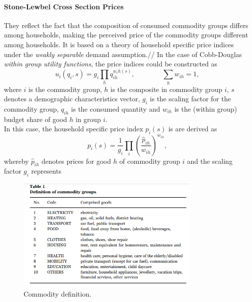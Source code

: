 \paragraph{Stone-Lewbel Cross Section Prices\\}{They reflect the fact that the composition of consumed commodity groups differs among households, making the perceived price of the commodity groups different among households. It is based on a theory of household specific price indices under the \textit{weakly separable} demand assumption.//
	In the case of Cobb-Douglas \textit{within group utility functions}, the price indices could be constructed as
	\begin{equation}\label{eq2.2.5a}
		u_i(q_i, s)=g_i \prod_h q_{ih}^{w_ih(s)},   \qquad \qquad \sum_{h}w_{ih} = 1,
	\end{equation}
where $i$ is the commodity group, $h$ is the composite in commodity group $i$, $s$ denotes a demographic characteristics vector, $g_i$ is the scaling factor for the commodity group, $q_{ih}$ is the consumed quantity and $w_{ih}$ is the (within group) budget share of good $h$ in group $i$. \\
	In this case, the household specific price index $p_i(s)$ is are derived as
	\begin{equation}\label{eq2.2.5b}
		p_i(s)=\frac{1}{g_i} \prod_{i} (\frac{\hat{p}_{ih}}{w_{ih}})^{w_{ih}},
	\end{equation}
whereby $\hat{p}_{ih}$ denotes prices for good $h$ of commodity group $i$ and the scaling factor $g_i$ represents



}


\begin{figure}[h]  %
	\centering
	\includegraphics[width=0.8\textwidth]{./figure/ch2/fig2.1_table1.png}
	\caption{Commodity definition.}\label{fig2.1}
\end{figure}

